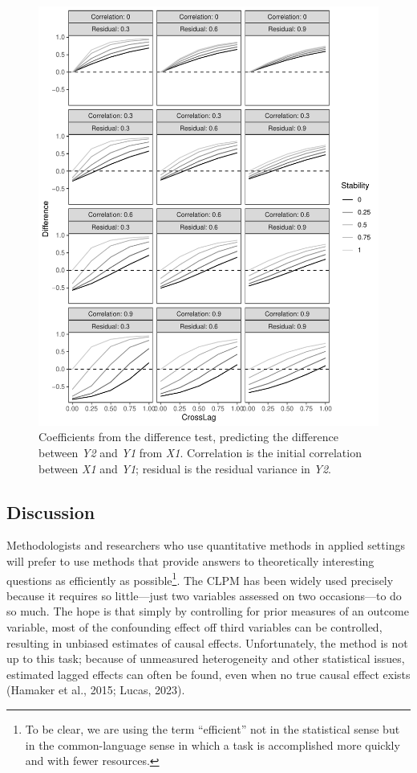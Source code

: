 \documentclass[
  man,floatsintext]{apa6}
\begin{document}
\begin{figure}
\centering
\includegraphics{triangulation_files/figure-latex/sim2-1.pdf}
\caption{\label{fig:sim2}Coefficients from the difference test, predicting the difference between \emph{Y2} and \emph{Y1} from \emph{X1}. Correlation is the initial correlation between \emph{X1} and \emph{Y1}; residual is the residual variance in \emph{Y2}.}
\end{figure}

\subsection{Discussion}\label{discussion}

Methodologists and researchers who use quantitative methods in applied settings will prefer to use methods that provide answers to theoretically interesting questions as efficiently as possible\footnote{To be clear, we are using the term ``efficient'' not in the statistical sense but in the common-language sense in which a task is accomplished more quickly and with fewer resources.}. The CLPM has been widely used precisely because it requires so little---just two variables assessed on two occasions---to do so much. The hope is that simply by controlling for prior measures of an outcome variable, most of the confounding effect off third variables can be controlled, resulting in unbiased estimates of causal effects. Unfortunately, the method is not up to this task; because of unmeasured heterogeneity and other statistical issues, estimated lagged effects can often be found, even when no true causal effect exists (Hamaker et al., 2015; Lucas, 2023).
\end{document}
